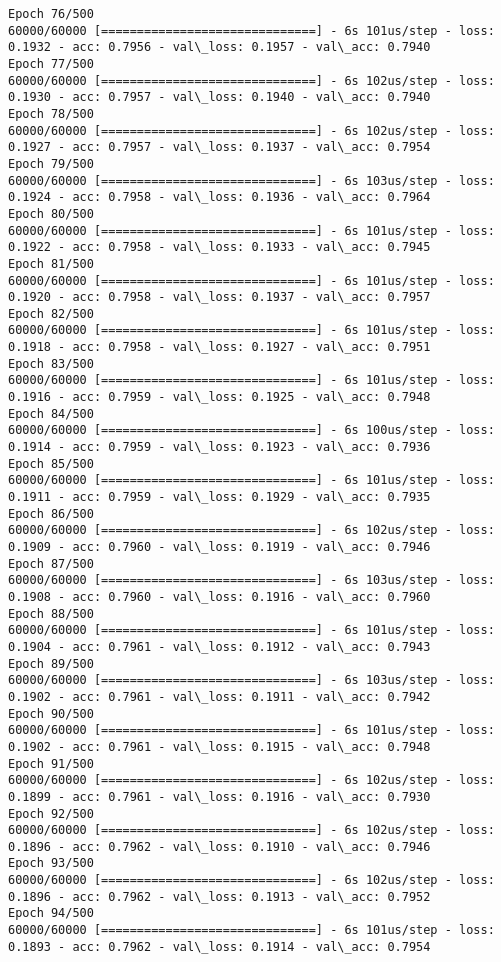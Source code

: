 \documentclass[11pt]{article}
\begin{document}
\begin{Verbatim}[commandchars=\\\{\}]
Epoch 76/500
60000/60000 [==============================] - 6s 101us/step - loss: 0.1932 - acc: 0.7956 - val\_loss: 0.1957 - val\_acc: 0.7940
Epoch 77/500
60000/60000 [==============================] - 6s 102us/step - loss: 0.1930 - acc: 0.7957 - val\_loss: 0.1940 - val\_acc: 0.7940
Epoch 78/500
60000/60000 [==============================] - 6s 102us/step - loss: 0.1927 - acc: 0.7957 - val\_loss: 0.1937 - val\_acc: 0.7954
Epoch 79/500
60000/60000 [==============================] - 6s 103us/step - loss: 0.1924 - acc: 0.7958 - val\_loss: 0.1936 - val\_acc: 0.7964
Epoch 80/500
60000/60000 [==============================] - 6s 101us/step - loss: 0.1922 - acc: 0.7958 - val\_loss: 0.1933 - val\_acc: 0.7945
Epoch 81/500
60000/60000 [==============================] - 6s 101us/step - loss: 0.1920 - acc: 0.7958 - val\_loss: 0.1937 - val\_acc: 0.7957
Epoch 82/500
60000/60000 [==============================] - 6s 101us/step - loss: 0.1918 - acc: 0.7958 - val\_loss: 0.1927 - val\_acc: 0.7951
Epoch 83/500
60000/60000 [==============================] - 6s 101us/step - loss: 0.1916 - acc: 0.7959 - val\_loss: 0.1925 - val\_acc: 0.7948
Epoch 84/500
60000/60000 [==============================] - 6s 100us/step - loss: 0.1914 - acc: 0.7959 - val\_loss: 0.1923 - val\_acc: 0.7936
Epoch 85/500
60000/60000 [==============================] - 6s 101us/step - loss: 0.1911 - acc: 0.7959 - val\_loss: 0.1929 - val\_acc: 0.7935
Epoch 86/500
60000/60000 [==============================] - 6s 102us/step - loss: 0.1909 - acc: 0.7960 - val\_loss: 0.1919 - val\_acc: 0.7946
Epoch 87/500
60000/60000 [==============================] - 6s 103us/step - loss: 0.1908 - acc: 0.7960 - val\_loss: 0.1916 - val\_acc: 0.7960
Epoch 88/500
60000/60000 [==============================] - 6s 101us/step - loss: 0.1904 - acc: 0.7961 - val\_loss: 0.1912 - val\_acc: 0.7943
Epoch 89/500
60000/60000 [==============================] - 6s 103us/step - loss: 0.1902 - acc: 0.7961 - val\_loss: 0.1911 - val\_acc: 0.7942
Epoch 90/500
60000/60000 [==============================] - 6s 101us/step - loss: 0.1902 - acc: 0.7961 - val\_loss: 0.1915 - val\_acc: 0.7948
Epoch 91/500
60000/60000 [==============================] - 6s 102us/step - loss: 0.1899 - acc: 0.7961 - val\_loss: 0.1916 - val\_acc: 0.7930
Epoch 92/500
60000/60000 [==============================] - 6s 102us/step - loss: 0.1896 - acc: 0.7962 - val\_loss: 0.1910 - val\_acc: 0.7946
Epoch 93/500
60000/60000 [==============================] - 6s 102us/step - loss: 0.1896 - acc: 0.7962 - val\_loss: 0.1913 - val\_acc: 0.7952
Epoch 94/500
60000/60000 [==============================] - 6s 101us/step - loss: 0.1893 - acc: 0.7962 - val\_loss: 0.1914 - val\_acc: 0.7954

\end{Verbatim}
\end{document}
